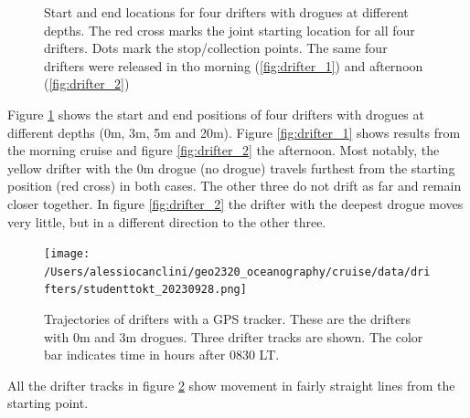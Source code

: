 \documentclass[a4paper,10pt,english]{article}
\begin{document}
\begin{figure}[H]
    \caption{Start and end locations for four drifters with drogues at different depths. The red cross marks the joint starting location for all four drifters. Dots mark the stop/collection points. The same four drifters were released in tho morning (\ref*{fig:drifter_1}) and afternoon (\ref*{fig:drifter_2})}
    \label{fig:drifters}
\end{figure}

Figure \ref*{fig:drifters} shows the start and end positions of four drifters with drogues at different depths (0m, 3m, 5m and 20m). Figure \ref*{fig:drifter_1} shows results from the morning cruise and figure \ref*{fig:drifter_2} the afternoon. Most notably, the yellow drifter with the 0m drogue (no drogue) travels furthest from the starting position (red cross) in both cases. The other three do not drift as far and remain closer together. In figure \ref*{fig:drifter_2} the drifter with the deepest drogue moves very little, but in a different direction to the other three.

\begin{figure}[H]
        \centering
        \texttt{[image: /Users/alessiocanclini/geo2320\_oceanography/cruise/data/drifters/studenttokt\_20230928.png]}
        \caption{Trajectories of drifters with a GPS tracker. These are the drifters with 0m and 3m drogues. Three drifter tracks are shown. The color bar indicates time in hours
        after 0830 LT.}
        \label{fig:drifter_tracks}
    \end{figure}

All the drifter tracks in figure \ref*{fig:drifter_tracks} show movement in fairly straight lines from the starting point.
\end{document}

